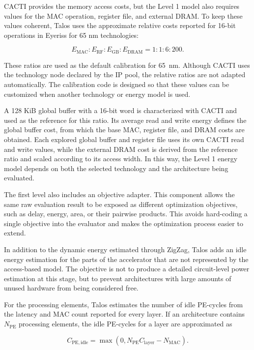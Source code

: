 CACTI provides the memory access costs, but the Level 1 model also
requires values for the MAC operation, register file, and external
DRAM. To keep these values coherent, Talos uses the approximate
relative costs reported for 16-bit operations in Eyeriss
\cite{eyeriss} for 65 nm technologies:

\[
E_{\mathrm{MAC}} : E_{\mathrm{RF}} : E_{\mathrm{GB}} :
E_{\mathrm{DRAM}} = 1 : 1 : 6 : 200.
\]

These ratios are used as the default calibration for 65~nm. Although
CACTI uses the technology node declared by the IP pool, the relative
ratios are not adapted automatically. The calibration code is designed
so that these values can be customized when another technology or
energy model is used.

A 128 KiB global buffer with a 16-bit word is characterized with CACTI
and used as the reference for this ratio. Its average read and write
energy defines the global buffer cost, from which the base MAC,
register file, and DRAM costs are obtained. Each explored global
buffer and register file uses its own CACTI read and write values,
while the external DRAM cost is derived from the reference ratio and
scaled according to its access width. In this way, the Level 1 energy
model depends on both the selected technology and the architecture
being evaluated.

The first level also includes an objective adapter. This component
allows the same raw evaluation result to be exposed as different
optimization objectives, such as delay, energy, area, or their
pairwise products. This avoids
hard-coding a single objective into the evaluator and makes the
optimization process easier to extend.

In addition to the dynamic energy estimated through ZigZag, Talos adds
an idle energy estimation for the parts of the accelerator that are
not represented by the access-based model. The objective is not to
produce a detailed circuit-level power estimation at this stage, but
to prevent architectures with large amounts of unused hardware from
being considered free.

For the processing elements, Talos estimates the number of idle
PE-cycles from the latency and MAC count reported for every layer. If
an architecture contains $N_{\mathrm{PE}}$ processing elements, the
idle PE-cycles for a layer are approximated as

\[
C_{\mathrm{PE,idle}} =
\max(0,
N_{\mathrm{PE}} C_{\mathrm{layer}} -
N_{\mathrm{MAC}}).
\]

